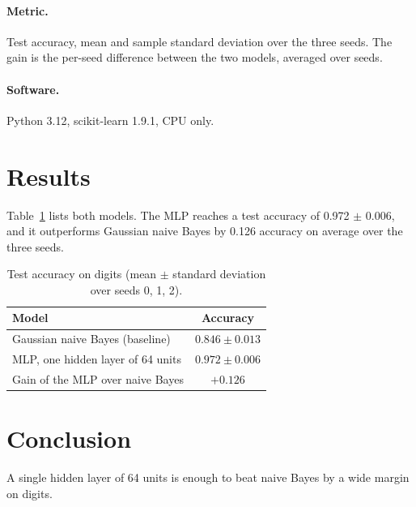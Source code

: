 \documentclass[11pt]{article}
\begin{document}
\paragraph{Metric.} Test accuracy, mean and sample standard deviation over the three seeds. The
gain is the per-seed difference between the two models, averaged over seeds.
\paragraph{Software.} Python 3.12, scikit-learn 1.9.1, CPU only.

\section{Results}
Table~\ref{tab:digits-mlp} lists both models. The MLP reaches a test accuracy of
0.972 $\pm$ 0.006, and it outperforms Gaussian naive Bayes by 0.126 accuracy on average over the
three seeds.

\begin{table}[t]
\centering
\caption{Test accuracy on digits (mean $\pm$ standard deviation over seeds 0, 1, 2).}
\label{tab:digits-mlp}
\begin{tabular}{lc}
\toprule
Model & Accuracy \\
\midrule
Gaussian naive Bayes (baseline) & $0.846 \pm 0.013$ \\
MLP, one hidden layer of 64 units & $0.972 \pm 0.006$ \\
\midrule
Gain of the MLP over naive Bayes & $+0.126$ \\
\bottomrule
\end{tabular}
\end{table}

\section{Conclusion}
A single hidden layer of 64 units is enough to beat naive Bayes by a wide margin on digits.
\end{document}
